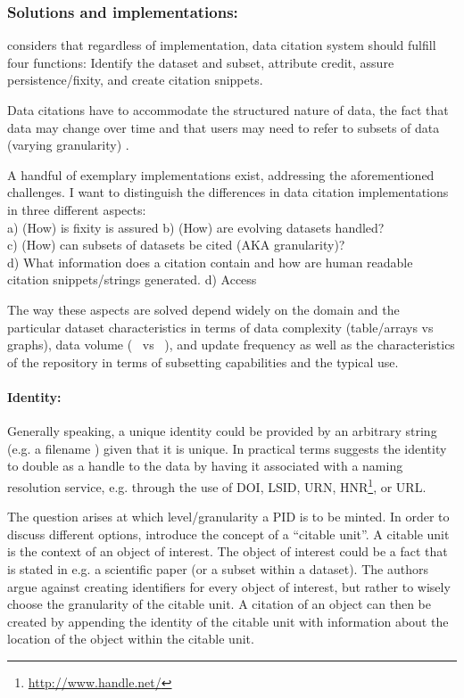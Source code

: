 \documentclass[a4paper,10pt]{article}
\begin{document}
\subsubsection{Solutions and implementations:}
\citep{Silvello2017} considers that regardless of implementation, data citation system should fulfill four functions: Identify the dataset and subset, attribute credit, assure persistence/fixity, and create citation snippets.  

Data citations have to accommodate the structured nature of data, the fact that data may change over time and that users may need to refer to subsets of data (varying granularity) \citep{Buneman2010}.

A handful of exemplary implementations exist, addressing the aforementioned challenges.
I want to distinguish the differences in data citation implementations in three different aspects: \\
a) (How) is fixity is assured 
b) (How) are evolving datasets handled? \\
c) (How) can subsets of datasets be cited (AKA granularity)? \\
d) What information does a citation contain and how are human readable citation snippets/strings generated.
d) Access

The way these aspects are solved depend widely on the domain and the particular dataset characteristics in terms of data complexity (table/arrays vs graphs), data volume (\si{\kilo\byte} vs \si{\peta\byte}), and update frequency as well as the characteristics of the repository in terms of subsetting capabilities and the typical use.

\paragraph{Identity:}
Generally speaking, a unique identity could be provided by an arbitrary string (e.g. a filename \citep{Buneman2016}) given that it is unique.
In practical terms \citep{AltKin07} suggests the identity to double as a handle to the data by having it associated with a naming resolution service, e.g. through the use of \gls{DOI},  \gls{LSID}, \gls{URN}, \gls{HNR}\footnote{\url{http://www.handle.net/}}, or \gls{URL}.

The question arises at which level/granularity a PID is to be minted.
In order to discuss different options, \citep{Buneman2010} introduce the concept of a ``citable unit''. A citable unit is the context of an object of interest. The object of interest could be a fact that is stated in e.g. a scientific paper (or a subset within a dataset). The authors argue against creating identifiers for every object of interest, but rather to wisely choose the granularity of the citable unit. A citation of an object can then be created by appending the identity of the citable unit with information about the location of the object within the citable unit.
 
\end{document}
